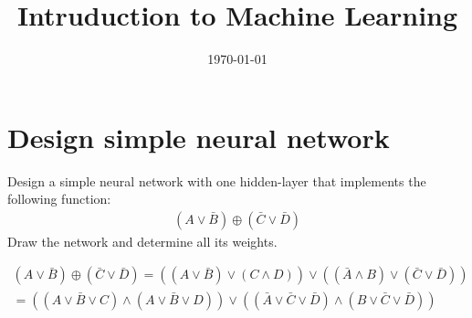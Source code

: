 \documentclass[12pt]{article}
\title{Intruduction to Machine Learning}
\date{\today}
\begin{document}
\maketitlepage
\maketitlestart

\section{Design simple neural network}
Design a simple neural network with one hidden-layer that implements the following function:
\begin{gather*}
    (A\vee \bar{B}) \oplus (\bar{C} \vee \bar{D})
\end{gather*}
Draw the network and determine all its weights.
\begin{qsolve}
    \begin{gather*}
        (A\vee \bar{B}) \oplus (\bar{C} \vee \bar{D}) = ((A\vee \bar{B}) \vee (C \wedge D)) \vee ((\bar{A} \wedge B) \vee (\bar{C} \vee \bar{D}))\\
        = ((A\vee \bar{B} \vee C) \wedge (A\vee \bar{B} \vee D)) \vee ((\bar{A} \vee \bar{C} \vee \bar{D}) \wedge (B \vee \bar{C} \vee \bar{D}))
    \end{gather*}
\end{qsolve}




















\makeendpage
\end{document}
